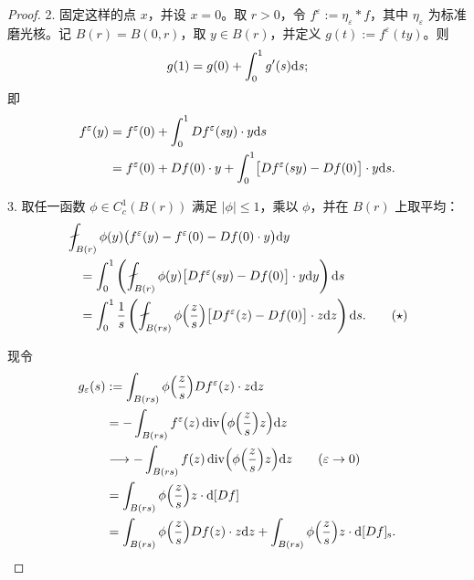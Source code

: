 \documentclass[../../main.tex]{subfiles}%
\begin{document}
\begin{proof}
2. 固定这样的点 $x$，并设 $x=0$。取 $r>0$，令 $f^\varepsilon:=\eta_\varepsilon*f$，其中 $\eta_\varepsilon$ 为标准磨光核。记 $B(r)=B(0,r)$，取 $y\in B(r)$，并定义 $g(t):=f^\varepsilon(ty)$。则
\begin{align*}
g(1)=g(0)+\int_0^1g'(s)\mathrm{d} s;
\end{align*}
即
\begin{align*}
f^\varepsilon(y)&=f^\varepsilon(0)+\int_0^1Df^\varepsilon(sy)\cdot y\mathrm{d} s\\
&=f^\varepsilon(0)+Df(0)\cdot y+\int_0^1\bigl[Df^\varepsilon(sy)-Df(0)\bigr]\cdot y\mathrm{d} s.
\end{align*}

3. 取任一函数 $\phi\in C_c^1(B(r))$ 满足 $\lvert\phi\rvert\leqslant1$，乘以 $\phi$，并在 $B(r)$ 上取平均：
\begin{align*}
&\fint_{B(r)}\phi(y)\bigl(f^\varepsilon(y)-f^\varepsilon(0)-Df(0)\cdot y\bigr)\diff y\\
&\quad=\int_0^1\left(\fint_{B(r)}\phi(y)\bigl[Df^\varepsilon(sy)-Df(0)\bigr]\cdot y\diff y\right)\diff s\\
&\quad=\int_0^1\frac{1}{s}\left(\fint_{B(rs)}\phi\Bigl(\frac{z}{s}\Bigr)\bigl[Df^\varepsilon(z)-Df(0)\bigr]\cdot z\diff z\right)\diff s.\qquad(\star)
\end{align*}

现令
\begin{align*}
g_\varepsilon(s)&:=\int_{B(rs)}\phi\Bigl(\frac{z}{s}\Bigr)Df^\varepsilon(z)\cdot z\mathrm{d} z\\
&=-\int_{B(rs)}f^\varepsilon(z)\operatorname{div}\Bigl(\phi\Bigl(\frac{z}{s}\Bigr)z\Bigr)\mathrm{d} z\\
&\longrightarrow-\int_{B(rs)}f(z)\operatorname{div}\Bigl(\phi\Bigl(\frac{z}{s}\Bigr)z\Bigr)\mathrm{d} z\qquad(\varepsilon\to0)\\
&=\int_{B(rs)}\phi\Bigl(\frac{z}{s}\Bigr)z\cdot\mathrm{d}[Df]\\
&=\int_{B(rs)}\phi\Bigl(\frac{z}{s}\Bigr)Df(z)\cdot z\mathrm{d} z+\int_{B(rs)}\phi\Bigl(\frac{z}{s}\Bigr)z\cdot\mathrm{d}[Df]_{\mathrm{s}}.
\end{align*}


\end{proof}
\end{document}
